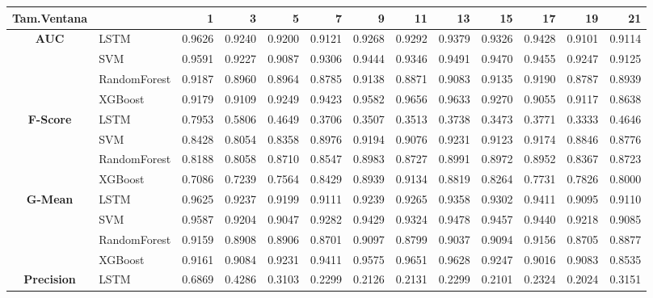 \begin{table}[h]
	\centering
	\begin{adjustbox}{max width=15cm}
		\begin{tabular}{|c|l|r|r|r|r|r|r|r|r|r|r|r|}
			\hline
			\textbf{Tam.Ventana} &         &      1  &      3  &      5  &      7  &      9  &      11 &      13 &      15 &      17 &      19 &      21 \\
			\hline
			\textbf{AUC} & LSTM &  0.9626 &  0.9240 &  0.9200 &  0.9121 &  0.9268 &  0.9292 &  0.9379 &  0.9326 &  0.9428 &  0.9101 &  0.9114 \\
			& SVM &  0.9591 &  0.9227 &  0.9087 &  0.9306 &  0.9444 &  0.9346 &  0.9491 &  0.9470 &  0.9455 &  0.9247 &  0.9125 \\
			& RandomForest &  0.9187 &  0.8960 &  0.8964 &  0.8785 &  0.9138 &  0.8871 &  0.9083 &  0.9135 &  0.9190 &  0.8787 &  0.8939 \\
			& XGBoost &  0.9179 &  0.9109 &  0.9249 &  0.9423 &  0.9582 &  0.9656 &  0.9633 &  0.9270 &  0.9055 &  0.9117 &  0.8638 \\
			\hline
			\textbf{F-Score} & LSTM &  0.7953 &  0.5806 &  0.4649 &  0.3706 &  0.3507 &  0.3513 &  0.3738 &  0.3473 &  0.3771 &  0.3333 &  0.4646 \\
			& SVM &  0.8428 &  0.8054 &  0.8358 &  0.8976 &  0.9194 &  0.9076 &  0.9231 &  0.9123 &  0.9174 &  0.8846 &  0.8776 \\
			& RandomForest &  0.8188 &  0.8058 &  0.8710 &  0.8547 &  0.8983 &  0.8727 &  0.8991 &  0.8972 &  0.8952 &  0.8367 &  0.8723 \\
			& XGBoost &  0.7086 &  0.7239 &  0.7564 &  0.8429 &  0.8939 &  0.9134 &  0.8819 &  0.8264 &  0.7731 &  0.7826 &  0.8000 \\
			\hline
			\textbf{G-Mean} & LSTM &  0.9625 &  0.9237 &  0.9199 &  0.9111 &  0.9239 &  0.9265 &  0.9358 &  0.9302 &  0.9411 &  0.9095 &  0.9110 \\
			& SVM &  0.9587 &  0.9204 &  0.9047 &  0.9282 &  0.9429 &  0.9324 &  0.9478 &  0.9457 &  0.9440 &  0.9218 &  0.9085 \\
			& RandomForest &  0.9159 &  0.8908 &  0.8906 &  0.8701 &  0.9097 &  0.8799 &  0.9037 &  0.9094 &  0.9156 &  0.8705 &  0.8877 \\
			& XGBoost &  0.9161 &  0.9084 &  0.9231 &  0.9411 &  0.9575 &  0.9651 &  0.9628 &  0.9247 &  0.9016 &  0.9083 &  0.8535 \\
			\hline
			\textbf{Precision} & LSTM &  0.6869 &  0.4286 &  0.3103 &  0.2299 &  0.2126 &  0.2131 &  0.2299 &  0.2101 &  0.2324 &  0.2024 &  0.3151 \\

\end{tabular}
\end{adjustbox}
\end{table}
